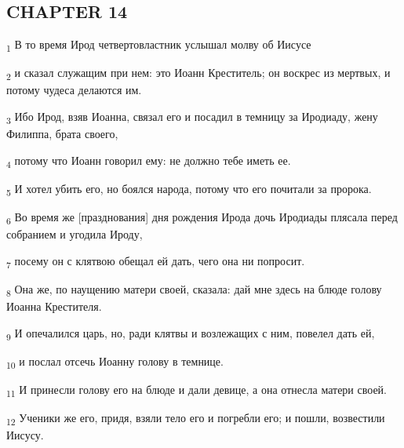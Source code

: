 \subsection{CHAPTER 14}
\begin{tcolorbox}
\textsubscript{1} В то время Ирод четвертовластник услышал молву об Иисусе
\end{tcolorbox}
\begin{tcolorbox}
\textsubscript{2} и сказал служащим при нем: это Иоанн Креститель; он воскрес из мертвых, и потому чудеса делаются им.
\end{tcolorbox}
\begin{tcolorbox}
\textsubscript{3} Ибо Ирод, взяв Иоанна, связал его и посадил в темницу за Иродиаду, жену Филиппа, брата своего,
\end{tcolorbox}
\begin{tcolorbox}
\textsubscript{4} потому что Иоанн говорил ему: не должно тебе иметь ее.
\end{tcolorbox}
\begin{tcolorbox}
\textsubscript{5} И хотел убить его, но боялся народа, потому что его почитали за пророка.
\end{tcolorbox}
\begin{tcolorbox}
\textsubscript{6} Во время же [празднования] дня рождения Ирода дочь Иродиады плясала перед собранием и угодила Ироду,
\end{tcolorbox}
\begin{tcolorbox}
\textsubscript{7} посему он с клятвою обещал ей дать, чего она ни попросит.
\end{tcolorbox}
\begin{tcolorbox}
\textsubscript{8} Она же, по наущению матери своей, сказала: дай мне здесь на блюде голову Иоанна Крестителя.
\end{tcolorbox}
\begin{tcolorbox}
\textsubscript{9} И опечалился царь, но, ради клятвы и возлежащих с ним, повелел дать ей,
\end{tcolorbox}
\begin{tcolorbox}
\textsubscript{10} и послал отсечь Иоанну голову в темнице.
\end{tcolorbox}
\begin{tcolorbox}
\textsubscript{11} И принесли голову его на блюде и дали девице, а она отнесла матери своей.
\end{tcolorbox}
\begin{tcolorbox}
\textsubscript{12} Ученики же его, придя, взяли тело его и погребли его; и пошли, возвестили Иисусу.
\end{tcolorbox}
